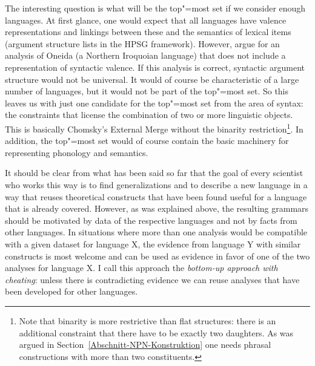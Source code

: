 The interesting question is what will be the top"=most set if we consider enough languages. At
first glance, one would expect that all languages have valence representations and linkings between
these and the semantics of lexical items (argument structure lists in the HPSG framework). However,
\citet{KM2012a} argue for an analysis of Oneida (a Northern Iroquoian language) that does not
include a representation of syntactic valence. If this analysis is correct, syntactic argument
structure would not be universal. It would of course be characteristic of a large number of
languages, but it would not be part of the top"=most set. So this leaves us with just one candidate
for the top"=most set from the area of syntax: the constraints that license the combination of two or more linguistic
objects. This is basically Chomsky's External Merge without the binarity restriction\footnote{
  Note that binarity is more restrictive than flat structures: there is an additional constraint
  that there have to be exactly two daughters. As was argued in Section~\ref{Abschnitt-NPN-Konstruktion} one needs phrasal
  constructions with more than two constituents.
}. In addition, the top"=most set would of course contain the basic machinery for representing phonology and semantics.  


It should be clear from what has been said so far that the goal of every scientist who works this
way is to find generalizations and to describe a new language in a way that reuses theoretical constructs
that have been found useful for a language that is already covered. However, as was explained above,
the resulting grammars should be motivated by data of the respective languages and not by facts from
other languages. In situations where more than one analysis would be compatible with a given dataset
for language X, the evidence from language Y with similar constructs is most welcome and can be used
as evidence in favor of one of the two analyses for language X. I call this approach the
\emph{bottom-up approach with cheating}: unless there is contradicting evidence we can reuse
analyses that have been developed for other languages.  

